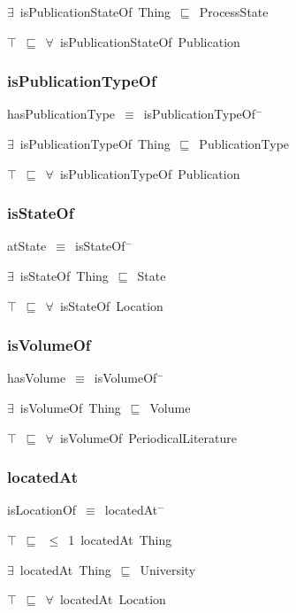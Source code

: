 \documentclass{article}
\begin{document}
\ensuremath{\exists}~isPublicationStateOf~Thing~\ensuremath{\sqsubseteq}~ProcessState

\ensuremath{\top}~\ensuremath{\sqsubseteq}~\ensuremath{\forall}~isPublicationStateOf~Publication

\subsubsection*{isPublicationTypeOf}

hasPublicationType~\ensuremath{\equiv}~isPublicationTypeOf\ensuremath{^-}

\ensuremath{\exists}~isPublicationTypeOf~Thing~\ensuremath{\sqsubseteq}~PublicationType

\ensuremath{\top}~\ensuremath{\sqsubseteq}~\ensuremath{\forall}~isPublicationTypeOf~Publication

\subsubsection*{isStateOf}

atState~\ensuremath{\equiv}~isStateOf\ensuremath{^-}

\ensuremath{\exists}~isStateOf~Thing~\ensuremath{\sqsubseteq}~State

\ensuremath{\top}~\ensuremath{\sqsubseteq}~\ensuremath{\forall}~isStateOf~Location

\subsubsection*{isVolumeOf}

hasVolume~\ensuremath{\equiv}~isVolumeOf\ensuremath{^-}

\ensuremath{\exists}~isVolumeOf~Thing~\ensuremath{\sqsubseteq}~Volume

\ensuremath{\top}~\ensuremath{\sqsubseteq}~\ensuremath{\forall}~isVolumeOf~PeriodicalLiterature

\subsubsection*{locatedAt}

isLocationOf~\ensuremath{\equiv}~locatedAt\ensuremath{^-}

\ensuremath{\top}~\ensuremath{\sqsubseteq}~\ensuremath{\leq}~1~locatedAt~Thing

\ensuremath{\exists}~locatedAt~Thing~\ensuremath{\sqsubseteq}~University

\ensuremath{\top}~\ensuremath{\sqsubseteq}~\ensuremath{\forall}~locatedAt~Location
\end{document}
